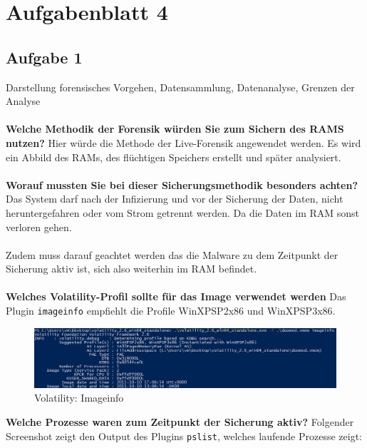 \documentclass[
    a4paper,
    pagesize,
	pdftex,
    12pt,
]{scrartcl}
\begin{document}
\newpage
\section{Aufgabenblatt 4}

\subsection{Aufgabe 1}
Darstellung forensisches Vorgehen, Datensammlung, Datenanalyse, Grenzen der Analyse
\\ \\
\textbf{Welche Methodik der Forensik würden Sie zum Sichern des RAMS nutzen?}
Hier würde die Methode der Live-Forensik angewendet werden. Es wird ein Abbild des RAMs, des flüchtigen Speichers erstellt und später analysiert. \cite{ram-dump}
\\ \\
\textbf{Worauf mussten Sie bei dieser Sicherungsmethodik besonders achten?}
Das System darf nach der Infizierung und vor der Sicherung der Daten, nicht heruntergefahren oder vom Strom getrennt werden. Da die Daten im RAM sonst verloren gehen. \\ \\
Zudem muss darauf geachtet werden das die Malware zu dem Zeitpunkt der Sicherung aktiv ist, sich also weiterhin im RAM befindet.
\\ \\
\textbf{Welches Volatility-Profil sollte für das Image verwendet werden}
Das Plugin \lstinline[breaklines]|imageinfo| empfiehlt die Profile WinXPSP2x86 und WinXPSP3x86.
\begin{figure}[H]
	\centering
	\includegraphics[width=18cm]{vol-imageinfo.png}
	\caption{Volatility: Imageinfo}
	\label{fig:vol-imageinfo}
\end{figure} 
\textbf{Welche Prozesse waren zum Zeitpunkt der Sicherung aktiv?}
Folgender Screenshot zeigt den Output des Plugins \lstinline[breaklines]|pslist|, welches laufende Prozesse zeigt:
\end{document}
